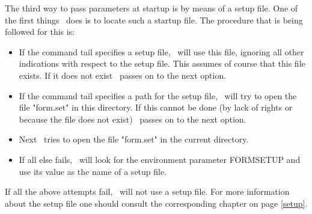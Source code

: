 The third way to pass parameters at startup is by means of a setup 
file. 
One of the first things \FORM\ does is to locate such a startup file. The 
procedure that is being followed for this is:
\begin{itemize}
\item If the command tail specifies a setup file, \FORM\ will use this file, 
ignoring all other indications with respect to the setup file. This assumes 
of course that this file exists. If it does not exist \FORM\ passes on to the 
next option.
\item If the command tail specifies a path for the setup file, \FORM\ will 
try to open the file "form.set" in this directory. If this cannot be done 
(by lack of rights or because the file does not exist) \FORM\ passes on to 
the next option.
\item Next \FORM\ tries to open the file "form.set" in the 
current directory.\item If all else fails, \FORM\ will look for the 
environment parameter FORMSETUP and use its value as the name of a setup 
file.
\end{itemize}
If all the above attempts fail, \FORM\ will not use a setup file. For more 
information about the setup file one should consult the corresponding 
chapter on page \ref{setup}.
